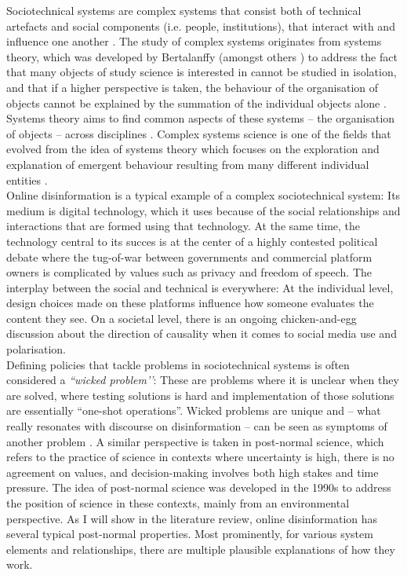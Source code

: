 \documentclass[10pt,a4paper]{article}
\begin{document}
Sociotechnical systems are complex systems that consist both of technical artefacts and social components (i.e. people, institutions), that interact with and influence one another \citep{Nikolic2012}. The study of complex systems originates from systems theory, which was developed by Bertalanffy (amongst others \citep{Ryan2008}) to address the fact that many objects of study science is interested in cannot be studied in isolation, and that if a higher perspective is taken, the behaviour of the organisation of objects cannot be explained by the summation of the individual objects alone \citep{Bertalanffy1972}. Systems theory aims to find common aspects of these systems – the organisation of objects – across disciplines \citep{Boulding1956}. Complex systems science is one of the fields that evolved from the idea of systems theory which focuses on the exploration and explanation of emergent behaviour resulting from many different individual entities \citep{Ryan2008}. \\

Online disinformation is a typical example of a complex sociotechnical system: Its medium is digital technology, which it uses because of the social relationships and interactions that are formed using that technology. At the same time, the technology central to its succes is at the center of a highly contested political debate where the tug-of-war between governments and commercial platform owners is complicated by values such as privacy and freedom of speech. The interplay between the social and technical is everywhere: At the individual level, design choices made on these platforms influence how someone evaluates the content they see. On a societal level, there is an ongoing chicken-and-egg discussion about the direction of causality when it comes to social media use and polarisation. \\

Defining policies that tackle problems in sociotechnical systems is often considered a \textit{``wicked problem’’}: These are problems where it is unclear when they are solved, where testing solutions is hard and implementation of those solutions are essentially “one-shot operations”. Wicked problems are unique and – what really resonates with discourse on disinformation – can be seen as symptoms of another problem \citep{Rittel1973}. A similar perspective is taken in post-normal science, which  refers to the practice of science in contexts where uncertainty is high, there is no agreement on values, and decision-making involves both high stakes and time pressure. The idea of post-normal science was developed in the 1990s to address the position of science in these contexts, mainly from an environmental perspective. As I will show in the literature review, online disinformation has several typical post-normal properties. Most prominently, for various system elements and relationships, there are multiple plausible explanations of how they work. \\
\end{document}
